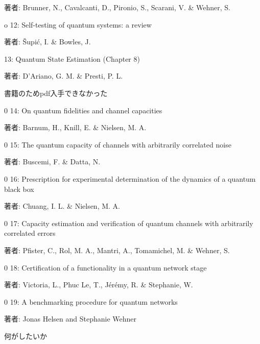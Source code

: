 \documentclass[conference]{IEEEtran}
\begin{document}
著者: Brunner, N., Cavalcanti, D., Pironio, S., Scarani, V. \& Wehner, S. 

o 12: Self-testing of quantum systems: a review

著者: Šupić, I. \& Bowles, J. 

13: Quantum State Estimation (Chapter 8)

著者: D'Ariano, G. M. \& Presti, P. L.

書籍のためpdf入手できなかった

0 14: On quantum fidelities and channel capacities

著者: Barnum, H., Knill, E. \& Nielsen, M. A. 

0 15: The quantum capacity of channels with arbitrarily correlated noise

著者: Buscemi, F. \& Datta, N. 

0 16: Prescription for experimental determination of the dynamics of a quantum black box

著者: Chuang, I. L. \& Nielsen, M. A. 

0 17: Capacity estimation and verification of quantum channels with arbitrarily correlated errors

著者: Pfister, C., Rol, M. A., Mantri, A., Tomamichel, M. \& Wehner, S. 

0 18: Certification of a functionality in a quantum network stage

著者: Victoria, L., Phuc Le, T., Jérémy, R. \& Stephanie, W.

0 19: A benchmarking procedure for quantum networks

著者: Jonas Helsen and Stephanie Wehner




何がしたいか
\end{document}
